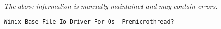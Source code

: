 \label{pkg:winix\_base\_data\_file\_io\_driver\_for\_posix\_\_premicrothread}

{\tiny \it The above information is manually maintained and may contain errors.}
\begin{verbatim}
Winix_Base_File_Io_Driver_For_Os__Premicrothread?
\end{verbatim}

